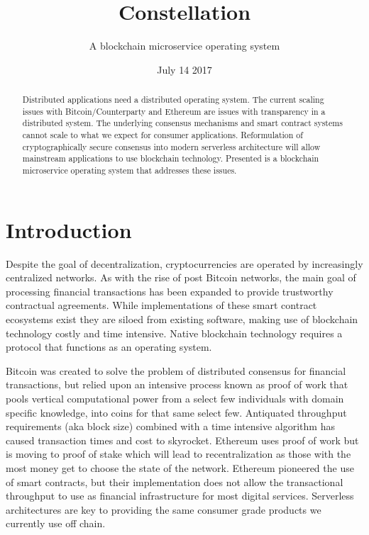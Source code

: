 \documentclass{article}
\title{Constellation}
\author{A blockchain microservice operating system}
\date{July 14 2017}
\begin{document}
\maketitle

\begin{abstract}
Distributed applications need a distributed operating system. The current scaling issues with Bitcoin/Counterparty and Ethereum are issues with transparency in a distributed system. The underlying consensus mechanisms and smart contract systems cannot scale to what we expect for consumer applications. Reformulation of cryptographically secure consensus into modern serverless architecture will allow mainstream applications to use blockchain technology. Presented is a blockchain microservice operating system that addresses these issues.\

\end{abstract}
\setcounter{secnumdepth}{0}
\section{Introduction}
Despite the goal of decentralization, cryptocurrencies are operated by increasingly centralized networks. As with the rise of post Bitcoin networks, the main goal of processing financial transactions has been expanded to provide trustworthy contractual agreements. While implementations of these smart contract ecosystems exist they are siloed from existing software, making use of blockchain technology costly and time intensive. Native blockchain technology requires a protocol that functions as an operating system. 

Bitcoin was created to solve the problem of distributed consensus for financial transactions, but relied upon an intensive process known as proof of work that pools vertical computational power from a select few individuals with domain specific knowledge, into coins for that same select few. Antiquated throughput requirements (aka block size) combined with a time intensive algorithm has caused transaction times and cost to skyrocket. Ethereum uses proof of work but is moving to proof of stake which will lead to recentralization as those with the most money get to choose the state of the network. Ethereum pioneered the use of smart contracts, but their implementation does not allow the transactional throughput to use as financial infrastructure for most digital services. Serverless architectures are key to providing the same consumer grade products we currently use off chain.
\end{document}
